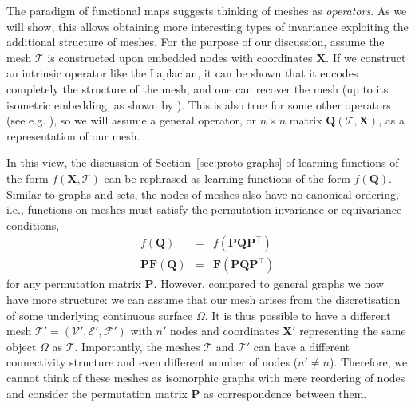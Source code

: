 The paradigm of functional maps suggests thinking of meshes as {\em operators}. As we will show, this allows obtaining more interesting types of invariance exploiting the additional structure of meshes.  
%
For the purpose of our discussion, assume the mesh $\mathcal{T}$ is constructed upon embedded nodes with coordinates $\mathbf{X}$. 
%
If we construct an intrinsic operator like the Laplacian, it can be shown that it encodes completely the structure of the mesh, and one can recover the mesh (up to its isometric embedding, as shown by \cite{zeng2012discrete}). 
%
This is also true for some other operators (see e.g. \cite{boscaini2015shape,corman2017functional,chern2018shape}), so we will assume a general operator, or $n\times n$ matrix  $\mathbf{Q}(\mathcal{T}, \mathbf{X})$, as a representation of our mesh.  


In this view, the discussion of Section~\ref{sec:proto-graphs} of learning functions of the form   $f(\mathbf{X},\mathcal{T})$ %
can be rephrased 
as learning functions of the form $f(\mathbf{Q})$. 
%
Similar to graphs and sets, the nodes of meshes also have no canonical ordering, i.e., functions on meshes must satisfy the permutation invariance or equivariance conditions, 
\begin{eqnarray*}
f(\mathbf{Q}) &=& f(\mathbf{P}\mathbf{Q}\mathbf{P}^\top) \\
%
\mathbf{P}\mathbf{F}(\mathbf{Q}) &=& \mathbf{F}(\mathbf{P}\mathbf{Q}\mathbf{P}^\top)
\end{eqnarray*}
% 
for any permutation matrix $\mathbf{P}$. 
%
%
However, compared to general graphs we now have more structure: we can assume that our mesh arises from the discretisation of some underlying continuous surface $\Omega$. It is thus possible to have a different mesh  $\mathcal{T}'=(\mathcal{V}',\mathcal{E}',\mathcal{F}')$ with $n'$ nodes and coordinates $\mathbf{X}'$ representing the same object $\Omega$ as $\mathcal{T}$. 
%
%
Importantly, the meshes $\mathcal{T}$ and $\mathcal{T}'$ can have a different connectivity structure and even different number of nodes ($n'\neq n$). Therefore, we cannot think of these meshes as isomorphic graphs with mere reordering of nodes and consider the permutation matrix $\mathbf{P}$ as correspondence between them. 


